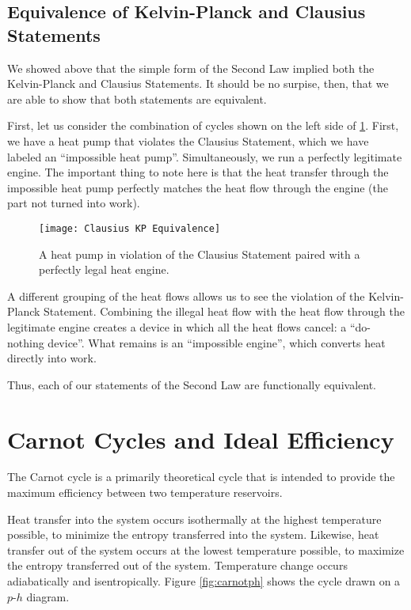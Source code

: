 \subsection{Equivalence of Kelvin-Planck and Clausius Statements}
We showed above that the simple form of the Second Law implied both the Kelvin-Planck and Clausius Statements.  It should be no surpise, then, that we are able to show that both statements are equivalent.

First, let us consider the combination of cycles shown on the left side of \ref{fig:ClausiusEquivalence}.  First, we have a heat pump that violates the Clausius Statement, which we have labeled an ``impossible heat pump''.  Simultaneously, we run a perfectly legitimate engine.  The important thing to note here is that the heat transfer through the impossible heat pump perfectly matches the heat flow through the engine (the part not turned into work).

\begin{figure}[H]
  \centering
  \texttt{[image: Clausius KP Equivalence]}
  \caption{A heat pump in violation of the Clausius Statement paired with a perfectly legal heat engine.}
  \label{fig:ClausiusEquivalence}
\end{figure}

A different grouping of the heat flows allows us to see the violation of the Kelvin-Planck Statement.  Combining the illegal heat flow with the heat flow through the legitimate engine creates a device in which all the heat flows cancel: a ``do-nothing device''.  What remains is an ``impossible engine'', which converts heat directly into work.

Thus, each of our statements of the Second Law are functionally equivalent.

\section{Carnot Cycles and Ideal Efficiency}
The Carnot cycle is a primarily theoretical cycle that is intended to provide the maximum efficiency between two temperature reservoirs.

Heat transfer into the system occurs isothermally at the highest temperature possible, to minimize the entropy transferred into the system.  Likewise, heat transfer out of the system occurs at the lowest temperature possible, to maximize the entropy transferred out of the system.  Temperature change occurs adiabatically and isentropically.  Figure \ref{fig:carnotph} shows the cycle drawn on a $p$-$h$ diagram. %

